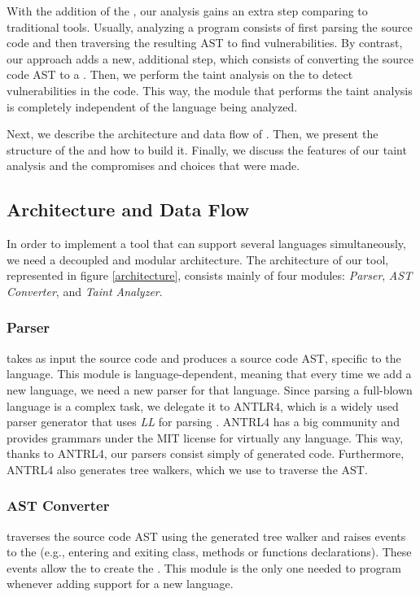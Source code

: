 With the addition of the \astname{}, our analysis gains an extra step comparing to traditional tools. Usually, analyzing a program consists of first parsing the source code and then traversing the resulting AST to find vulnerabilities. By contrast, our approach adds a new, additional step, which consists of converting the source code AST to a \astname{}. Then, we perform the taint analysis on the \astname{} to detect vulnerabilities in the code. This way, the module that performs the taint analysis is completely independent of the language being analyzed. 

Next, we describe the architecture and data flow of \toolname{}. Then, we present the  structure of the \astname{} and how to build it. Finally, we discuss the features of our taint analysis and the compromises and choices that were made.

\subsection{Architecture and Data Flow}

In order to implement a tool that can support several languages simultaneously, we need a decoupled and modular architecture. The architecture of our tool, represented in figure \ref{architecture}, consists mainly of four modules: \textit{Parser}, \textit{AST Converter}, \astbuilder{} and \textit{Taint Analyzer}.


\subsubsection{Parser} takes as input the source code and produces a source code AST, specific to the language. This module is language-dependent, meaning that every time we add a new language, we need a new parser for that language. Since parsing a full-blown language is a complex task, we delegate it to ANTLR4, which is a widely used parser generator that uses \textit{LL} for parsing \cite{antlr4book}. ANTRL4 has a big community and provides grammars under the MIT license for virtually any language. This way, thanks to ANTRL4, our parsers consist simply of generated code. Furthermore, ANTRL4 also generates tree walkers, which we use to traverse the AST.

\subsubsection{AST Converter} traverses the source code AST using the generated tree walker and raises events to the \astbuilder{} (e.g., entering and exiting class, methods or functions declarations). These events allow the \astbuilder{} to create the \astname{}. This module is the only one needed to program whenever adding support for a new language.
 
